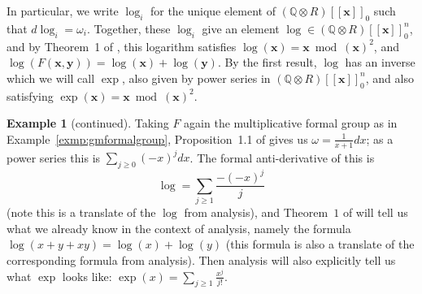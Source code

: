 \documentclass[12pt]{article}
\newcommand{\Q}{\mathbb{Q}}
\newcommand{\vx}{\mathbf{x}}
\newcommand{\vy}{\mathbf{y}}
\newcommand{\tensor}{\otimes}
\theoremstyle{plain}
\theoremstyle{definition}
\newtheorem{exmp}[thm]{Example} %
\theoremstyle{remark}
\begin{document}
In particular, we write $\log_i$ for the unique element of $(\Q\tensor R)[[\vx]]_0$ such that $d\log_i = \omega_i$. Together, these $\log_i$ give an element $\log \in (\Q\tensor R)[[\vx]]_0^n$, and by Theorem~1 of \cite{honda70}, this logarithm satisfies $\log(\vx) = \vx \bmod (\vx)^2$, and $\log(F(\vx,\vy)) = \log(\vx)+\log(\vy)$. By the first result, $\log$ has an inverse which we will call $\exp$, also given by power series in $(\Q\tensor R)[[\vx]]_0^n$, and also satisfying $\exp(\vx) = \vx \bmod (\vx)^2$.
\addtocounter{thm}{-1}
\begin{exmp}[continued]
Taking $F$ again the multiplicative formal group as in Example~\ref{exmp:gmformalgroup}, Proposition~1.1 of \cite{honda70} gives us $\omega = \frac{1}{x+1}dx$; as a power series this is $\sum_{j \geq 0} (-x)^jdx$. The formal anti-derivative of this is \[\log = \sum_{j \geq 1} \frac{-(-x)^j}{j}\] (note this is a translate of the $\log$ from analysis), and Theorem~$1$ of \cite{honda70} will tell us what we already know in the context of analysis, namely the formula $\log(x + y + xy) = \log(x)+\log(y)$ (this formula is also a translate of the corresponding formula from analysis). Then analysis will also explicitly tell us what $\exp$ looks like: $\exp(x) = \sum_{j \geq 1} \frac{x^j}{j!}$.
\end{exmp}
\addtocounter{thm}{2}
\end{document}
